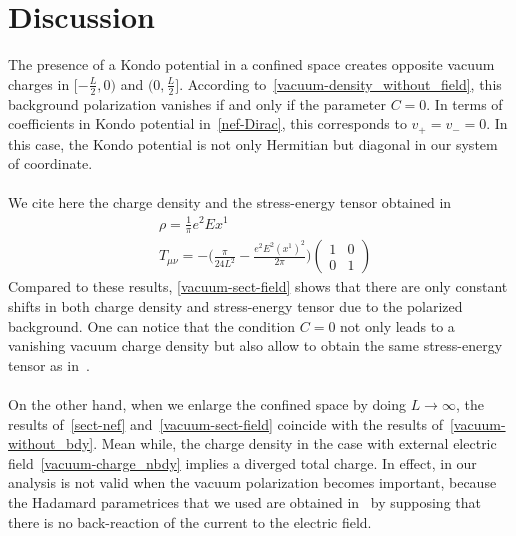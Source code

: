 \section{Discussion}
The presence of a Kondo potential in a confined space creates opposite vacuum charges in $[-\frac L 2, 0)$ and $(0, \frac L 2]$.
According to~\cref{vacuum-density_without_field}, 
this background polarization vanishes if and only if the parameter $C = 0$. 
In terms of coefficients in Kondo potential in~\cref{nef-Dirac},
this corresponds to $v_+ = v_- = 0$.
In this case, the Kondo potential is not only Hermitian but diagonal in our system of coordinate. \\\\
%
We cite here the charge density and the stress-energy tensor obtained in~\cite{Zahn2015}
\begin{equation*}
\begin{split}
& \rho = \frac 1 \pi e^2 Ex^1 \\
& T_{\mu\nu} = - \big( \frac{\pi}{24L^2} - \frac{e^2 E^2 (x^1)^2}{2\pi}\big) \begin{pmatrix} 1 & 0 \\ 0 & 1 \end{pmatrix}
\end{split}
\end{equation*}
Compared to these results, 
\cref{vacuum-sect-field} shows that there are only constant shifts in both charge density and stress-energy tensor due to the polarized background.
One can notice that the condition $C = 0$ not only leads to a vanishing vacuum charge density but also allow to obtain the same stress-energy tensor as in~\cite{Zahn2015}.
\\\\
On the other hand, when we enlarge the confined space by doing $L \rightarrow \infty$, 
the results of~\cref{sect-nef} and~\cref{vacuum-sect-field} coincide with the results of~\cref{vacuum-without_bdy}.
Mean while, the charge density in the case with external electric field~\cref{vacuum-charge_nbdy} implies a diverged total charge.
In effect, in our analysis is not valid when the vacuum polarization becomes important,
because the Hadamard parametrices that we used are obtained  in~\cite{Zahn2015} by supposing that there is no back-reaction of the current to the electric field.

































